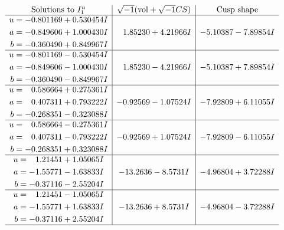 \documentclass[1p]{elsarticle_modified}
\theoremstyle{definition}
\newcommand{\I}{\sqrt{-1}}
\begin{document}
$$\begin{array}{c|c|c}  
\text{Solutions to }I^u_{1}& \I (\text{vol} + \sqrt{-1}CS) & \text{Cusp shape}\\
 \hline 
\begin{aligned}
u &= -0.801169 + 0.530454 I \\
a &= -0.849606 + 1.000430 I \\
b &= -0.360490 + 0.849967 I\end{aligned}
 & \phantom{-}1.85230 + 4.21966 I & -5.10387 - 7.89854 I \\ \hline\begin{aligned}
u &= -0.801169 - 0.530454 I \\
a &= -0.849606 - 1.000430 I \\
b &= -0.360490 - 0.849967 I\end{aligned}
 & \phantom{-}1.85230 - 4.21966 I & -5.10387 + 7.89854 I \\ \hline\begin{aligned}
u &= \phantom{-}0.586664 + 0.275361 I \\
a &= \phantom{-}0.407311 + 0.793222 I \\
b &= -0.268351 - 0.323088 I\end{aligned}
 & -0.92569 - 1.07524 I & -7.92809 + 6.11055 I \\ \hline\begin{aligned}
u &= \phantom{-}0.586664 - 0.275361 I \\
a &= \phantom{-}0.407311 - 0.793222 I \\
b &= -0.268351 + 0.323088 I\end{aligned}
 & -0.92569 + 1.07524 I & -7.92809 - 6.11055 I \\ \hline\begin{aligned}
u &= \phantom{-}1.21451 + 1.05065 I \\
a &= -1.55771 - 1.63833 I \\
b &= -0.37116 - 2.55204 I\end{aligned}
 & -13.2636 - 8.5731 I & -4.96804 + 3.72288 I \\ \hline\begin{aligned}
u &= \phantom{-}1.21451 - 1.05065 I \\
a &= -1.55771 + 1.63833 I \\
b &= -0.37116 + 2.55204 I\end{aligned}
 & -13.2636 + 8.5731 I & -4.96804 - 3.72288 I\\
 \hline 
 \end{array}$$\newpage\newpage\renewcommand{\arraystretch}{1}
\end{document}
